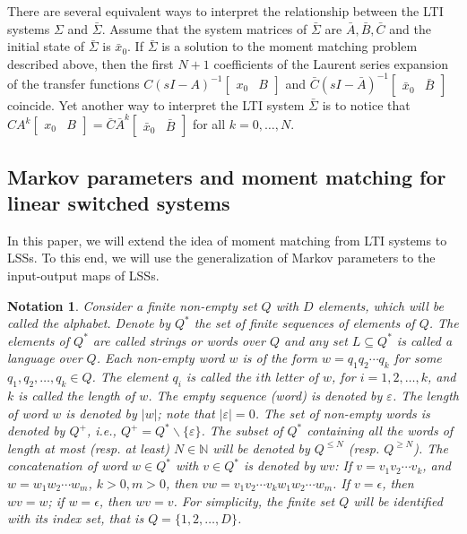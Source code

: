 \documentclass[journal]{IEEEtran}
\newtheorem{Notation}{Notation}
\begin{document}
There are several equivalent ways to interpret the relationship between the LTI systems $\Sigma$ and $\bar{\Sigma}$. Assume that the system matrices of $\bar{\Sigma}$ are $\bar{A},\bar{B},\bar{C}$ and the initial state of $\bar{\Sigma}$ is $\bar{x}_0$. If $\bar{\Sigma}$ is a solution to the moment matching problem described above, then the first $N+1$ coefficients of the Laurent series expansion of the transfer functions $C(sI-A)^{-1}\begin{bmatrix} x_0 & B \end{bmatrix}$ and $\bar{C}(sI-\bar{A})^{-1}\begin{bmatrix} \bar{x}_0 & \bar{B} \end{bmatrix}$ coincide. Yet another way to interpret the LTI system $\bar{\Sigma}$ is to notice that $CA^k\begin{bmatrix} x_0 & B \end{bmatrix} = \bar{C}\bar{A}^k\begin{bmatrix} \bar{x}_0 & \bar{B} \end{bmatrix}$ for all $k=0,\ldots,N$.

\subsection{Markov parameters and moment matching for linear switched systems}

In this paper, we will extend the idea of moment matching from LTI systems to LSSs. To this end, we will use the generalization of Markov parameters to the input-output maps of LSSs.

\begin{Notation} \label{Notation1}
	Consider a finite non-empty set $Q$ with $D$ elements, which will be called the \emph{alphabet}. Denote by $Q^*$ the set of finite sequences of elements of $Q$. The elements of $Q^*$ are called \emph{strings} or \emph{words} over $Q$ and any set $L \subseteq Q^*$ is called a \emph{language} over $Q$. Each non-empty word $w$ is of the form $w=q_1q_2 \cdots q_k$ for some $q_1,q_2,\dots,q_k \in Q$. The element $q_i$ is called the \emph{$i$th letter of $w$}, for $i=1,2,\dots,k$, and $k$ is called the \emph{length} of $w$. The \emph{empty sequence (word)} is denoted by $\varepsilon$. The length of word $w$ is denoted by $|w|$; note that $|\varepsilon|=0$. The set of non-empty words is denoted by $Q^+$, i.e., $Q^+=Q^*\backslash\{\varepsilon\}$. The subset of $Q^*$ containing all the words of length at most (resp. at least) $N \in \mathbb{N}$ will be denoted by $Q^{\leq N}$ (resp. $Q^{\geq N}$). The \emph{concatenation} of word $w \in Q^*$ with $v \in Q^*$ is denoted by $wv$: If $v=v_{1}v_2 \cdots v_{k}$, and  $w=w_{1}w_2 \cdots w_{m}$, $k > 0, m >0$, then $vw=v_{1}v_2 \cdots v_{k}w_{1}w_2 \cdots w_{m}$. If $v=\epsilon$, then $wv=w$; if $w=\epsilon$, then $wv=v$. For simplicity, the finite set $Q$ will be identified with its index set, that is $Q=\{1,2,\dots,D\}$.
\end{Notation}
\end{document}
